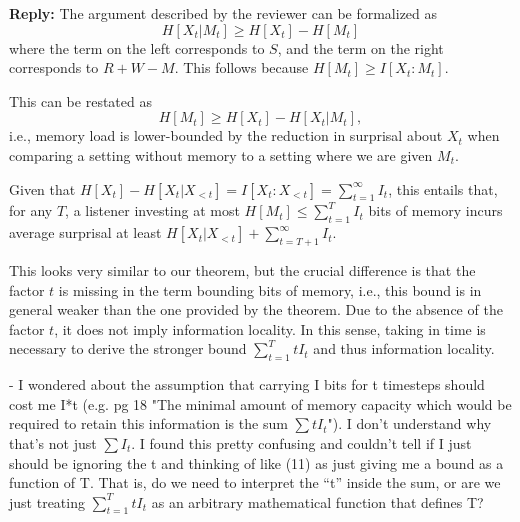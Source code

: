 \documentclass{article}[11pt,a4paper,oneside]
\newcommand\jd[1]{\textcolor{teal}{[jd: #1]}}
\newenvironment{reply}
  {\par\medskip
   \color{blue}%
   \begin{framed}
   \textbf{Reply: }\ignorespaces}
 {\end{framed}
  \medskip}
\begin{document}
\begin{reply}
The argument described by the reviewer can be formalized as
\begin{equation}
H[X_t|M_t] \geq H[X_t] - H[M_t]
\end{equation}
where the term on the left corresponds to $S$, and the term on the right corresponds to $R+W-M$.
This follows because $H[M_t] \ge I[X_t : M_t]$.

This can be restated as 
\begin{equation}
H[M_t] \geq H[X_t] - H[X_t|M_t],
\end{equation}
i.e., memory load is lower-bounded by the reduction in surprisal about $X_t$ when comparing a setting without memory to a setting where we are given $M_t$.

Given that $H[X_t] - H[X_t|X_{<t}] = I[X_t:X_{<t}] = \sum_{t=1}^\infty I_t$, this entails that, for any $T$, a listener investing at most $H[M_t] \leq \sum_{t=1}^T I_t$ bits of memory incurs average surprisal at least $H[X_t|X_{<t}] + \sum_{t=T+1}^\infty I_t$.

This looks very similar to our theorem, but the crucial difference is that the factor $t$ is missing in the term bounding bits of memory, i.e., this bound is in general weaker than the one provided by the theorem.
	Due to the absence of the factor $t$, it does not imply information locality.
In this sense, taking in time is necessary to derive the stronger bound $\sum_{t=1}^T t I_t$ and thus information locality.
\end{reply}

- I wondered about the assumption that carrying I bits for t timesteps should cost me I*t (e.g. pg 18 "The minimal amount of memory capacity which would be required to retain this information is the sum $\sum t I_t$"). I don't understand why that's not just $\sum I_t$. I found this pretty confusing and couldn't tell if I just should be ignoring the t and thinking of like (11) as just giving me a bound as a function of T. That is, do we need to interpret the ``t'' inside the sum, or are we just treating $\sum_{t=1}^T t I_t$ as an arbitrary mathematical function that defines T?
\end{document}
